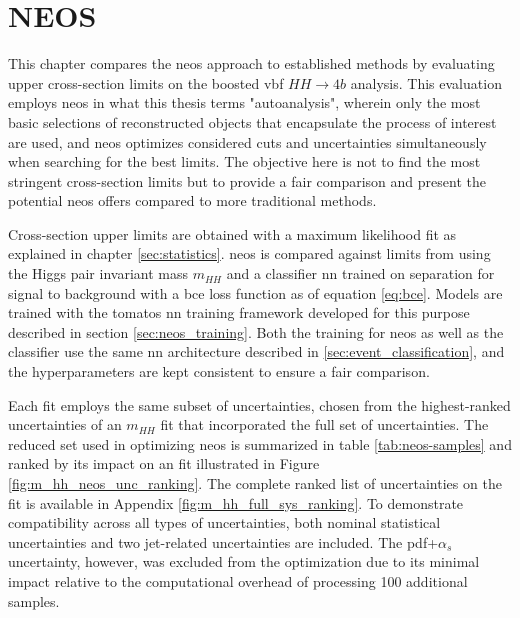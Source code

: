\chapter{NEOS}





This chapter compares the \ac{neos} approach to established methods by evaluating upper cross-section limits on the boosted \ac{vbf} $HH\rightarrow4b$ analysis. This evaluation employs \ac{neos} in what this thesis terms "autoanalysis", wherein only the most basic selections of reconstructed objects that encapsulate the process of interest are used, and \ac{neos} optimizes considered cuts and uncertainties simultaneously when searching for the best limits. The objective here is not to find the most stringent cross-section limits but to provide a fair comparison and present the potential \ac{neos} offers compared to more traditional methods.

Cross-section upper limits are obtained with a maximum likelihood fit as explained in chapter \ref{sec:statistics}. \ac{neos} is compared against limits from using the Higgs pair invariant mass $m_{HH}$ and a classifier \ac{nn} trained on separation for signal to background with a \ac{bce} loss function as of equation \ref{eq:bce}. Models are trained with the \ac{tomatos} \ac{nn} training framework developed for this purpose \citep{tomatos} described in section \ref{sec:neos_training}. Both the training for \ac{neos} as well as the classifier use the same \ac{nn} architecture described in \ref{sec:event_classification}, and the hyperparameters are kept consistent to ensure a fair comparison.

Each fit employs the same subset of uncertainties, chosen from the highest-ranked uncertainties of an $m_{HH}$ fit that incorporated the full set of uncertainties. The reduced set used in optimizing \ac{neos} is summarized in table \ref{tab:neos-samples} and ranked by its impact on an \mhh fit illustrated in Figure \ref{fig:m_hh_neos_unc_ranking}. The complete ranked list of uncertainties on the \mhh fit is available in Appendix \ref{fig:m_hh_full_sys_ranking}. To demonstrate compatibility across all types of uncertainties, both nominal statistical uncertainties and two jet-related uncertainties are included. The \ac{pdf}+$\alpha_s$ uncertainty, however, was excluded from the optimization due to its minimal impact relative to the computational overhead of processing 100 additional samples.


